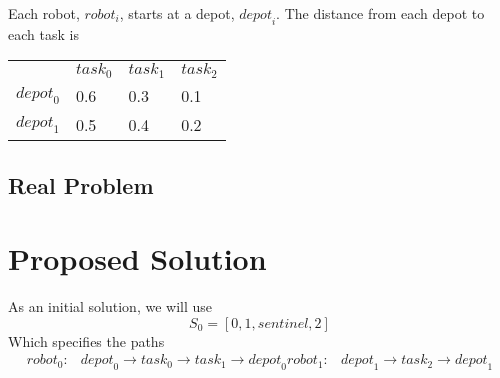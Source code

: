 \documentclass[a4paper]{article}
\begin{document}
Each robot, $\mathit{robot}_i$, starts at a depot, $\mathit{depot}_i$. The
distance from each depot to each task is

\begin{tabular}{llll}
                   & $\mathit{task}_0$ & $\mathit{task}_1$ & $\mathit{task}_2$ \\
$\mathit{depot}_0$ & 0.6               & 0.3               & 0.1               \\
$\mathit{depot}_1$ & 0.5               & 0.4               & 0.2               \\
\end{tabular}
\vspace{1.5em}

\subsection{Real Problem}



\section{Proposed Solution}

As an initial solution, we will use
$$S_0 = [0, 1, \mathit{sentinel}, 2 ]$$
Which specifies the paths
\begin{align*}
\mathit{robot}_0: & \mathit{depot}_0 \rightarrow \mathit{task}_0 \rightarrow \mathit{task}_1 \rightarrow  \mathit{depot}_0
\mathit{robot}_1: & \mathit{depot}_1 \rightarrow \mathit{task}_2 \rightarrow \mathit{depot}_1
\end{align*}



\end{document}

